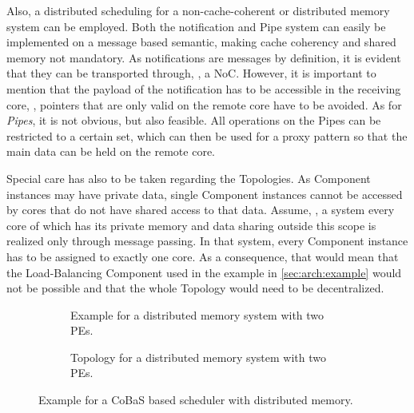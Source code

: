 Also, a distributed scheduling for a non-cache-coherent or distributed memory system can be employed. Both the notification and Pipe system can easily be implemented on a message based semantic, making cache coherency and shared memory not mandatory. As notifications are messages by definition, it is evident that they can be transported through, \eg{}, a \ac{NoC}. However, it is important to mention that the payload of the notification has to be accessible in the receiving core, \ie{}, pointers that are only valid on the remote core have to be avoided. As for \emph{Pipes}, it is not obvious, but also feasible. All operations on the Pipes can be restricted to a certain set, which can then be used for a proxy pattern so that the main data can be held on the remote core.

Special care has also to be taken regarding the Topologies. As Component instances may have private data, single Component instances cannot be accessed by cores that do not have shared access to that data. Assume, \eg{}, a system every core of which has its private memory and data sharing outside this scope is realized only through message passing. In that system, every Component instance has to be assigned to exactly one core. As a consequence, that would mean that the Load-Balancing Component used in the example in \cref{sec:arch:example} would not be possible and that the whole Topology would need to be decentralized.

\begin{figure}[t!]
	\centering
	\begin{subfigure}[b]{0.375\textwidth}\centering
		\caption{Example for a distributed memory system with two PEs.}%
		\label{fig:feature:remote1}
	\end{subfigure}
	\hfill
	\begin{subfigure}[b]{0.575\textwidth}\centering
		\caption{Topology for a distributed memory system with two PEs.}%
		\label{fig:feature:remote2}
	\end{subfigure}
	\caption{Example for a CoBaS based scheduler with distributed memory.}%
	\label{fig:feature:remote}
\end{figure}

